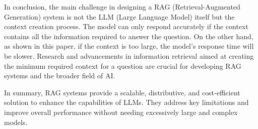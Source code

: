 \documentclass{wseas}
\begin{document}
In conclusion, the main challenge in designing a RAG (Retrieval-Augmented Generation) system is not the
LLM (Large Language Model) itself but the context creation process. The model can only respond accurately 
if the context contains all the information required to answer the question. On the other hand, as shown 
in this paper, if the context is too large, the model's response time will be slower. Research and advancements 
in information retrieval aimed at creating the minimum required context for a question are crucial for developing 
RAG systems and the broader field of AI.

In summary, RAG systems provide a scalable, distributive, and cost-efficient solution to enhance the capabilities of LLMs. 
They address key limitations and improve overall performance without needing excessively large and complex models. 
\end{document}
